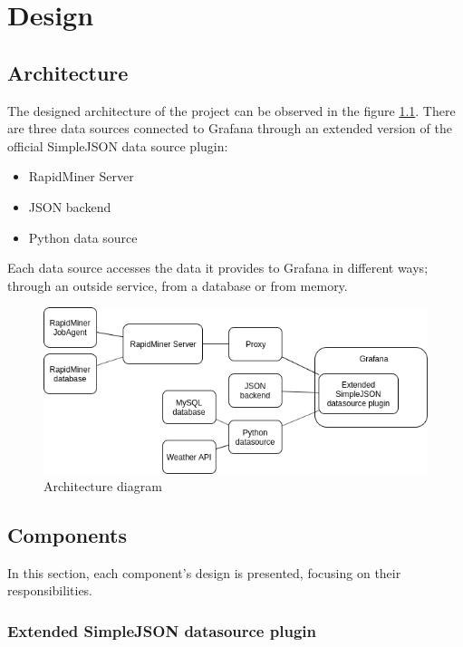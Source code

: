 \chapter{Design}

\section{Architecture} \label{arch-design}

The designed architecture of the project can be observed in the figure \ref{fig:arch}. There are three data sources connected to Grafana through an extended version of the official SimpleJSON data source plugin:

\begin{itemize}
	\item RapidMiner Server
	\item JSON backend
	\item Python data source
\end{itemize}

Each data source accesses the data it provides to Grafana in different ways; through an outside service, from a database or from memory.

\begin{figure}[h]
	\centering
	\includegraphics[width=150mm, keepaspectratio]{figures/architecture.png}
	\caption{Architecture diagram}
	\label{fig:arch}
\end{figure}

\section{Components}

In this section, each component's design is presented, focusing on their responsibilities.

\subsection{Extended SimpleJSON datasource plugin} \label{simplejson-design}

